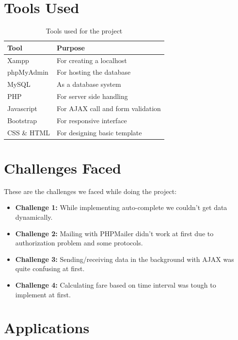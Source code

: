 \clearpage

\section{Tools Used}

\begin{table}[H]
\centering
\caption{Tools used for the project}
\label{my-label}
\begin{tabular}{|l|l|}
\hline
\textbf{Tool} & \textbf{Purpose}         \\ \hline
Xampp         & For creating a localhost \\ \hline
phpMyAdmin    & For hosting the database \\ \hline
MySQL    	  & As a database system \\ \hline
PHP    		  & For server side handling \\ \hline
Javascript    & For AJAX call and form validation \\ \hline
Bootstrap     & For responsive interface \\ \hline
CSS \& HTML   & For designing basic template \\ \hline
\end{tabular}
\end{table}

\clearpage

\section{Challenges Faced}
These are the challenges we faced while doing the project:
\begin{itemize}
\item \textbf{Challenge 1: } While implementing auto-complete we couldn't get data dynamically.
\item \textbf{Challenge 2: } Mailing with PHPMailer didn't work at first due to authorization problem and some protocols.
\item \textbf{Challenge 3: } Sending/receiving data in the background with AJAX was quite confusing at first.
\item \textbf{Challenge 4: } Calculating fare based on time interval was tough to implement at first.
\end{itemize}

\clearpage

\section{Applications}

